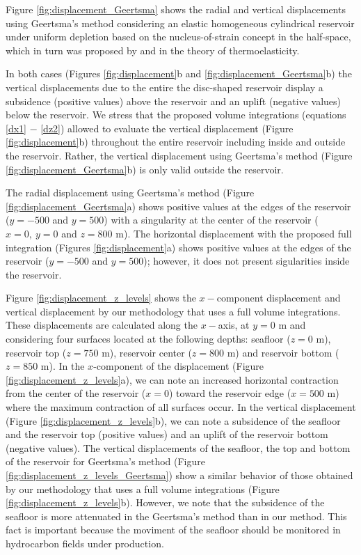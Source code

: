 \documentclass[journal abbreviation, manuscript]{copernicus}
\begin{document}
Figure \ref{fig:displacement_Geertsma} shows the radial and vertical displacements using Geertsma’s method \citep{Geertsma73}  considering an elastic homogeneous cylindrical reservoir under uniform depletion based on the nucleus-of-strain concept in the half-space, which in turn was proposed by \cite{Mindlin&Cheng50} and \cite{Sen51} in the theory of thermoelasticity.

In both cases (Figures \ref{fig:displacement}b and \ref{fig:displacement_Geertsma}b) the vertical displacements due to the entire the disc-shaped reservoir display a subsidence (positive values) above the reservoir and an uplift (negative values) below the reservoir.
We stress that the proposed volume integrations  (equations \ref{dx1} $-$ \ref{dz2})  allowed  to evaluate the  vertical displacement (Figure \ref{fig:displacement}b) throughout  the entire reservoir including inside and outside the reservoir.
Rather, the  vertical displacement using Geertsma’s method 
(Figure \ref{fig:displacement_Geertsma}b) is only valid outside the reservoir. 

The radial displacement using Geertsma’s method 
(Figure \ref{fig:displacement_Geertsma}a) shows positive values at the edges of the reservoir ($y= -500$ and $y = 500$) with a singularity at the center of the reservoir 
($x= 0, \: y = 0$ and $z = 800$ m). 
The horizontal displacement with the proposed full integration 
(Figures \ref{fig:displacement}a) shows positive values at the edges of the reservoir ($y= -500$ and $y = 500$); however, it does not present sigularities inside the reservoir.
 
Figure \ref{fig:displacement_z_levels} shows the $x-$component displacement and vertical displacement by our methodology that uses a full volume integrations.
These displacements are calculated along the $x-$axis, at $y = 0$ m and considering four surfaces located at the following depths:  seafloor ($z = 0$ m), reservoir top ($z = 750$ m), reservoir center ($z = 800$ m) and reservoir bottom ($z = 850$ m).
In the $x$-component of the displacement (Figure \ref{fig:displacement_z_levels}a), we can note an increased horizontal contraction from the center of the reservoir ($x = 0$) toward the reservoir edge ($x= 500$ m) where the maximum contraction of all surfaces occur.
In the vertical displacement (Figure \ref{fig:displacement_z_levels}b), we can note a subsidence of the seafloor and the reservoir top (positive values) and an uplift of the reservoir bottom (negative values).
The vertical displacements of the seafloor, the top and bottom of the reservoir for Geertsma’s method (Figure \ref{fig:displacement_z_levels_Geertsma}) show a similar behavior of those obtained by our methodology that uses a full volume integrations (Figure \ref{fig:displacement_z_levels}b). 
However, we note that the subsidence of the seafloor is more attenuated in the Geertsma’s method than in our method.
This fact is important because the moviment of the seafloor should be monitored in hydrocarbon fields under production.
\end{document}
